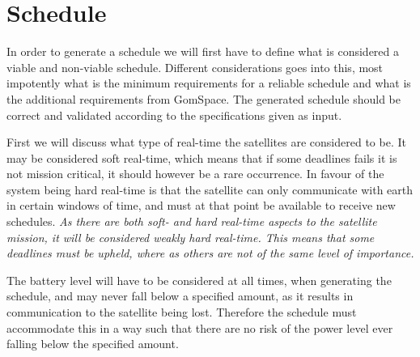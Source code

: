 \section{Schedule}
In order to generate a schedule we will first have to define what is considered a viable and non-viable schedule. Different considerations goes into this, most impotently what is the minimum requirements for a reliable schedule and what is the additional requirements from GomSpace. The generated schedule should be correct and validated according to the specifications given as input. 

First we will discuss what type of real-time the satellites are considered to be. It may be considered soft real-time, which means that if some deadlines fails it is not mission critical, it should however be a rare occurrence. In favour of the system being hard real-time is that the satellite can only communicate with earth in certain windows of time, and must at that point be available to receive new schedules. \textit{As there are both soft- and hard real-time aspects to the satellite mission, it will be considered weakly hard real-time. This means that some deadlines must be upheld, where as others are not of the same level of importance.}

The battery level will have to be considered at all times, when generating the schedule, and may never fall below a specified amount, as it results in communication to the satellite being lost.
Therefore the schedule must accommodate this in a way such that there are no risk of the power level ever falling below the specified amount. 



